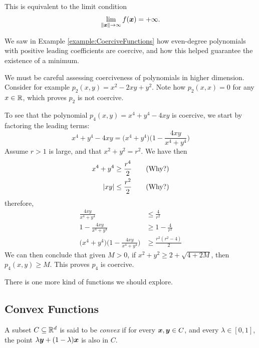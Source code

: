 \begin{remark}
This is equivalent to the limit condition  
\begin{equation*}
\lim_{\lVert \boldsymbol{x} \rVert\to \infty} f(\boldsymbol{x}) = +\infty.
\end{equation*}
\end{remark}

\begin{example}\label{example:CoerciveFunctionsGeneral}
We saw in Example \ref{example:CoerciveFunctions} how even-degree polynomials with positive leading coefficients are coercive, and how this helped guarantee the existence of a minimum.

We must be careful assessing coerciveness of polynomials in higher dimension. Consider for example $p_2(x,y) = x^2 - 2xy + y^2$.  Note how $p_2(x,x)=0$ for any $x \in \mathbb{R}$, which proves $p_2$ is not coercive.

To see that the polynomial $p_4(x, y) = x^4 + y^4 - 4xy$ is coercive, we start by factoring the leading terms:
\begin{equation*}
x^4 + y^4 - 4xy = \big( x^4 + y^4 \big) \bigg( 1 - \frac{4xy}{x^4 + y^4} \bigg)
\end{equation*}
Assume $r>1$ is large, and that $x^2+y^2 = r^2$.  We have then
\begin{align*}
x^4 + y^4 &\geq \frac{r^4}{2} \qquad\text{(Why?)} \\
 \lvert x y \rvert &\leq \frac{r^2}{2} \qquad\text{(Why?)}
\end{align*}
therefore, 
\begin{align*}
\frac{4xy}{x^4 + y^4} &\leq \frac{4}{r^2} \\
1 - \frac{4xy}{x^4 + y^4} &\geq 1 - \frac{4}{r^2} \\
\big( x^4 + y^4 \big) \bigg( 1 - \frac{4 x y}{x^4 + y^4} \bigg) &\geq \frac{r^2(r^2-4)}{2}
\end{align*} 
We can then conclude that given $M>0$, if $x^2+y^2 \geq  2+\sqrt{4+2M}$, then $p_4(x,y) \geq M$.  This proves $p_4$ is coercive.
\end{example}

There is one more kind of functions we should explore.

\subsection{Convex Functions}
\begin{definition}\label{def:convexSets}
A subset $C \subseteq \mathbb{R}^d$ is said to be \emph{convex} if for every $\boldsymbol{x}, \boldsymbol{y} \in C$, and every $\lambda \in [0,1]$, the point $\lambda \boldsymbol{y} + (1-\lambda) \boldsymbol{x}$ is also in $C$.
\end{definition}

